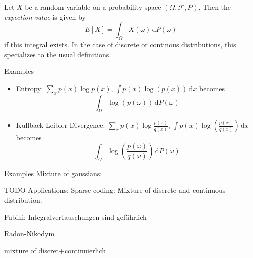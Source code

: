 \documentclass[compress]{beamer}
\newcommand{\td}{\,\mathrm{d}}  %
\begin{document}
\begin{frame}
  \begin{definition}
    Let $X$ be a random variable on a probability space $(\Omega, \mathcal{F},
    P)$. Then the \textit{expection value} is given by
    \[
      E[X] = \int_{\Omega} X(\omega) \td P(\omega)
    \]
    if this integral exists. In the case of discrete or continous distributions,
    this specializes to the usual definitions.
  \end{definition}
\end{frame}

\begin{frame}{Examples}
  \begin{itemize}
  \item Entropy: $\sum_x p(x)\log p(x)$, $\int p(x)\log(p(x))\td x$ becomes
   \[
     \int_{\Omega} \log(p(\omega))\td P(\omega)
   \]
 \item Kullback-Leibler-Divergence: $\sum_x p(x) \log\frac{p(x)}{q(x)}$, $\int
   p(x) \log\left(\frac{p(x)}{q(x)}\right) \td x$ becomes
   \[
     \int_{\Omega} \log\left(\frac{p(\omega)}{q(\omega)}\right) \td P(\omega)
   \]
  \end{itemize}
\end{frame}

\begin{frame}{Examples}
  Mixture of gaussians: 
\end{frame}

\begin{frame}{TODO}
  Applications: Sparse coding: Mixture of discrete and continuous distribution.

  Fubini: Integralvertauschungen sind gefährlich

  Radon-Nikodym

  mixture of discret+continuierlich
\end{frame}
\end{document}
